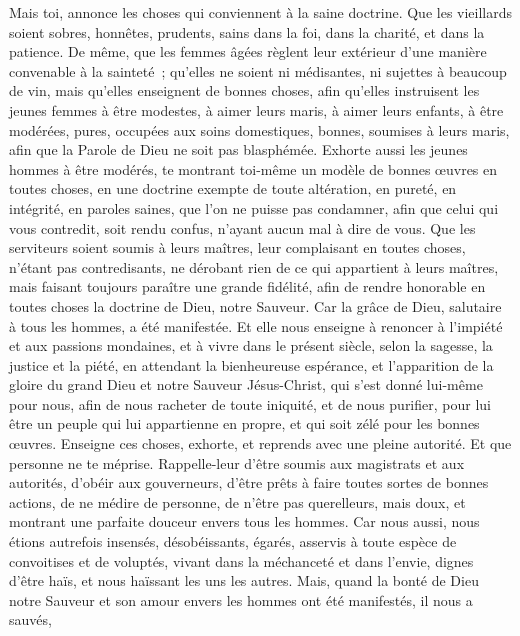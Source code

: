 \begin{multicols}{2}
\VerseOne{}Mais toi, annonce les choses qui conviennent à la saine doctrine.
Que les vieillards soient sobres, honnêtes, prudents, sains dans la foi, dans la charité, et dans la patience.
De même, que les femmes âgées règlent leur extérieur d'une manière convenable à la sainteté~; qu'elles ne soient ni médisantes, ni sujettes à beaucoup de vin, mais qu'elles enseignent de bonnes choses,
afin qu'elles instruisent les jeunes femmes à être modestes, à aimer leurs maris, à aimer leurs enfants,
à être modérées, pures, occupées aux soins domestiques, bonnes, soumises à leurs maris, afin que la Parole de Dieu ne soit pas blasphémée.
Exhorte aussi les jeunes hommes à être modérés,
te montrant toi-même un modèle de bonnes œuvres en toutes choses, en une doctrine exempte de toute altération, en pureté, en intégrité,
en paroles saines, que l'on ne puisse pas condamner, afin que celui qui vous contredit, soit rendu confus, n'ayant aucun mal à dire de vous.
Que les serviteurs soient soumis à leurs maîtres, leur complaisant en toutes choses, n'étant pas contredisants,
ne dérobant rien de ce qui appartient à leurs maîtres, mais faisant toujours paraître une grande fidélité, afin de rendre honorable en toutes choses la doctrine de Dieu, notre Sauveur.
Car la grâce de Dieu, salutaire à tous les hommes, a été manifestée.
Et elle nous enseigne à renoncer à l'impiété et aux passions mondaines, et à vivre dans le présent siècle, selon la sagesse, la justice et la piété,
en attendant la bienheureuse espérance, et l'apparition de la gloire du grand Dieu et notre Sauveur Jésus-Christ,
qui s'est donné lui-même pour nous, afin de nous racheter de toute iniquité, et de nous purifier, pour lui être un peuple qui lui appartienne en propre, et qui soit zélé pour les bonnes œuvres.
Enseigne ces choses, exhorte, et reprends avec une pleine autorité. Et que personne ne te méprise.
\VerseOne{}Rappelle-leur d'être soumis aux magistrats et aux autorités, d'obéir aux gouverneurs, d'être prêts à faire toutes sortes de bonnes actions,
de ne médire de personne, de n'être pas querelleurs, mais doux, et montrant une parfaite douceur envers tous les hommes.
Car nous aussi, nous étions autrefois insensés, désobéissants, égarés, asservis à toute espèce de convoitises et de voluptés, vivant dans la méchanceté et dans l'envie, dignes d'être haïs, et nous haïssant les uns les autres.
Mais, quand la bonté de Dieu notre Sauveur et son amour envers les hommes ont été manifestés, il nous a sauvés,

\end{multicols}
